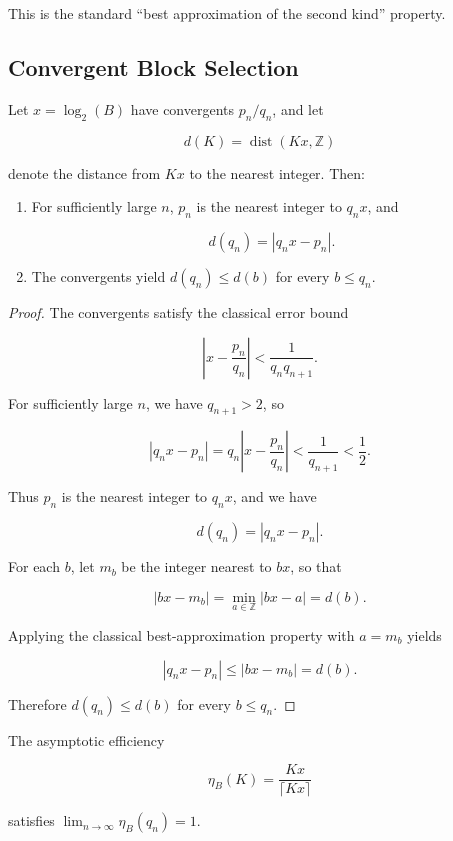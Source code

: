 \documentclass[10pt, onecolumn]{IEEEtran}
\begin{document}
This is the standard ``best approximation of the second kind'' property.

\subsection{Convergent Block Selection}

\begin{proposition}
Let $x = \log_2(B)$ have convergents $p_n/q_n$, and let

\[
d(K) = \operatorname{dist}(Kx, \mathbb{Z})
\]

denote the distance from $Kx$ to the nearest integer. Then:

\begin{enumerate}
\item For sufficiently large $n$, $p_n$ is the nearest integer to $q_n x$, and

\[
d(q_n) = |q_n x - p_n|.
\]

\item The convergents yield $d(q_n) \le d(b)$ for every $b \le q_n$.
\end{enumerate}
\end{proposition}

\begin{proof}
The convergents satisfy the classical error bound

\[
\left|x - \frac{p_n}{q_n}\right| < \frac{1}{q_n q_{n+1}}.
\]

For sufficiently large $n$, we have $q_{n+1} > 2$, so

\[
|q_n x - p_n| = q_n \left|x - \frac{p_n}{q_n}\right| < \frac{1}{q_{n+1}} < \frac{1}{2}.
\]

Thus $p_n$ is the nearest integer to $q_n x$, and we have

\[
d(q_n) = |q_n x - p_n|.
\]

For each $b$, let $m_b$ be the integer nearest to $b x$, so that

\[
|b x - m_b| = \min_{a \in \mathbb{Z}} |b x - a| = d(b).
\]

Applying the classical best-approximation property with $a = m_b$ yields

\[
|q_n x - p_n| \le |b x - m_b| = d(b).
\]

Therefore $d(q_n) \le d(b)$ for every $b \le q_n$.
\end{proof}

\begin{corollary}
The asymptotic efficiency

\[
\eta_B(K) = \frac{Kx}{\lceil Kx\rceil}
\]

satisfies $\lim_{n\to\infty} \eta_B(q_n) = 1$.
\end{corollary}
\end{document}
